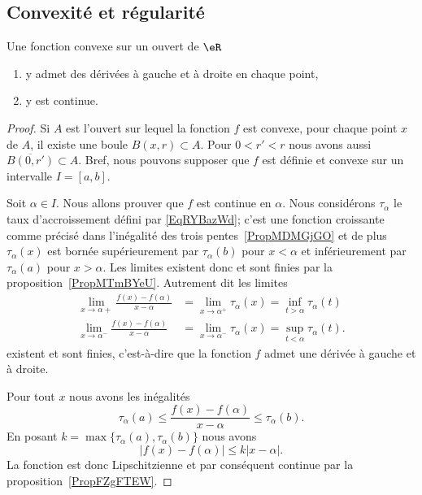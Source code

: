 \subsection{Convexité et régularité}

\begin{lemma}   \label{LemKLTsHIQ}
	Une fonction convexe sur un ouvert de \( \eR\)
	\begin{enumerate}
		\item
		      y admet des dérivées à gauche et à droite en chaque point,
		\item
		      y est continue.
	\end{enumerate}
\end{lemma}

\begin{proof}
	Si \( A\) est l'ouvert sur lequel la fonction \( f\) est convexe, pour chaque point \( x\) de \( A\), il existe une boule \( B(x,r)\subset A\). Pour \( 0<r'<r\) nous avons aussi \( \overline{B(0,r')}\subset A\). Bref, nous pouvons supposer que \( f\) est définie et convexe sur un intervalle \( I=[a ,b]\).

	Soit \( \alpha\in I\). Nous allons prouver que \( f\) est continue en \( \alpha\). Nous considérons \( \tau_{\alpha}\) le taux d'accroissement défini par \eqref{EqRYBazWd}; c'est une fonction croissante comme précisé dans l'inégalité des trois pentes~\ref{PropMDMGjGO} et de plus \( \tau_{\alpha}(x)\) est bornée supérieurement par \( \tau_{\alpha}(b)\) pour \( x<\alpha\) et inférieurement par \( \tau_{\alpha}(a)\) pour \( x>\alpha\). Les limites existent donc et sont finies par la proposition~\ref{PropMTmBYeU}. Autrement dit les limites
	\begin{subequations}
		\begin{align}
			\lim_{x\to \alpha+} \frac{ f(x)-f(\alpha) }{ x-\alpha }  & =\lim_{x\to \alpha^+} \tau_{\alpha}(x)=\inf_{t>\alpha}\tau_{\alpha}(t)  \\
			\lim_{x\to \alpha^-} \frac{ f(x)-f(\alpha) }{ x-\alpha } & =\lim_{x\to \alpha^-} \tau_{\alpha}(x)=\sup_{t<\alpha}\tau_{\alpha}(t).
		\end{align}
	\end{subequations}
	existent et sont finies, c'est-à-dire que la fonction \( f\) admet une dérivée à gauche et à droite.

	Pour tout \( x\) nous avons les inégalités
	\begin{equation}
		\tau_{\alpha}(a)\leq \frac{ f(x)-f(\alpha) }{ x-\alpha }\leq \tau_{\alpha}(b).
	\end{equation}
	En posant \( k=\max\{ \tau_{\alpha}(a),\tau_{\alpha}(b) \}\) nous avons
	\begin{equation}
		\big| f(x)-f(\alpha) \big|\leq k| x-\alpha |.
	\end{equation}
	La fonction est donc Lipschitzienne et par conséquent continue par la proposition~\ref{PropFZgFTEW}.
\end{proof}

